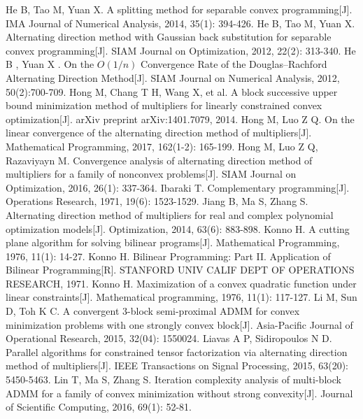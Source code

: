 \begin{thebibliography}{MM}
\begin{small}
		He B, Tao M, Yuan X. A splitting method for separable convex programming[J]. IMA Journal of Numerical Analysis, 2014, 35(1): 394-426.
		 He B, Tao M, Yuan X. Alternating direction method with Gaussian back substitution for separable convex programming[J]. SIAM Journal on Optimization, 2012, 22(2): 313-340.
		 He B , Yuan X . On the $O(1/n)$ Convergence Rate of the Douglas–Rachford Alternating Direction Method[J]. SIAM Journal on Numerical Analysis, 2012, 50(2):700-709.
		 Hong M, Chang T H, Wang X, et al. A block successive upper bound minimization method of multipliers for linearly constrained convex optimization[J]. arXiv preprint arXiv:1401.7079, 2014.
		 Hong M, Luo Z Q. On the linear convergence of the alternating direction method of multipliers[J]. Mathematical Programming, 2017, 162(1-2): 165-199.
		 Hong M, Luo Z Q, Razaviyayn M. Convergence analysis of alternating direction method of multipliers for a family of nonconvex problems[J]. SIAM Journal on Optimization, 2016, 26(1): 337-364.
		 Ibaraki T. Complementary programming[J]. Operations Research, 1971, 19(6): 1523-1529.
		 Jiang B, Ma S, Zhang S. Alternating direction method of multipliers for real and complex polynomial optimization models[J]. Optimization, 2014, 63(6): 883-898.
		 Konno H. A cutting plane algorithm for solving bilinear programs[J]. Mathematical Programming, 1976, 11(1): 14-27.
		 Konno H. Bilinear Programming: Part II. Application of Bilinear Programming[R]. STANFORD UNIV CALIF DEPT OF OPERATIONS RESEARCH, 1971.
		 Konno H. Maximization of a convex quadratic function under linear constraints[J]. Mathematical programming, 1976, 11(1): 117-127.
		 Li M, Sun D, Toh K C. A convergent 3-block semi-proximal ADMM for convex minimization problems with one strongly convex block[J]. Asia-Pacific Journal of Operational Research, 2015, 32(04): 1550024.
		 Liavas A P, Sidiropoulos N D. Parallel algorithms for constrained tensor factorization via alternating direction method of multipliers[J]. IEEE Transactions on Signal Processing, 2015, 63(20): 5450-5463.
		 Lin T, Ma S, Zhang S. Iteration complexity analysis of multi-block ADMM for a family of convex minimization without strong convexity[J]. Journal of Scientific Computing, 2016, 69(1): 52-81.

\end{small}
\end{thebibliography}

